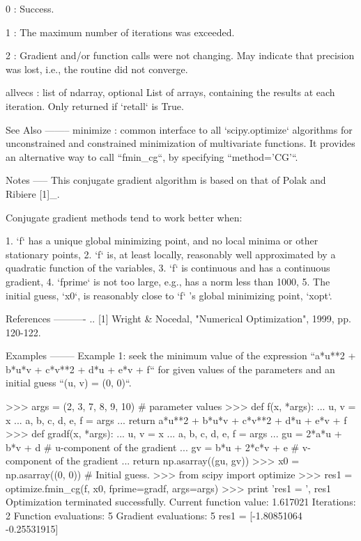 \begin{DoxyVerb}
    0 : Success.

    1 : The maximum number of iterations was exceeded.

    2 : Gradient and/or function calls were not changing.  May indicate
        that precision was lost, i.e., the routine did not converge.

allvecs : list of ndarray, optional
    List of arrays, containing the results at each iteration.
    Only returned if `retall` is True.

See Also
--------
minimize : common interface to all `scipy.optimize` algorithms for
           unconstrained and constrained minimization of multivariate
           functions.  It provides an alternative way to call
           ``fmin_cg``, by specifying ``method='CG'``.

Notes
-----
This conjugate gradient algorithm is based on that of Polak and Ribiere
[1]_.

Conjugate gradient methods tend to work better when:

1. `f` has a unique global minimizing point, and no local minima or
   other stationary points,
2. `f` is, at least locally, reasonably well approximated by a
   quadratic function of the variables,
3. `f` is continuous and has a continuous gradient,
4. `fprime` is not too large, e.g., has a norm less than 1000,
5. The initial guess, `x0`, is reasonably close to `f` 's global
   minimizing point, `xopt`.

References
----------
.. [1] Wright & Nocedal, "Numerical Optimization", 1999, pp. 120-122.

Examples
--------
Example 1: seek the minimum value of the expression
``a*u**2 + b*u*v + c*v**2 + d*u + e*v + f`` for given values
of the parameters and an initial guess ``(u, v) = (0, 0)``.

>>> args = (2, 3, 7, 8, 9, 10)  # parameter values
>>> def f(x, *args):
...     u, v = x
...     a, b, c, d, e, f = args
...     return a*u**2 + b*u*v + c*v**2 + d*u + e*v + f
>>> def gradf(x, *args):
...     u, v = x
...     a, b, c, d, e, f = args
...     gu = 2*a*u + b*v + d     # u-component of the gradient
...     gv = b*u + 2*c*v + e     # v-component of the gradient
...     return np.asarray((gu, gv))
>>> x0 = np.asarray((0, 0))  # Initial guess.
>>> from scipy import optimize
>>> res1 = optimize.fmin_cg(f, x0, fprime=gradf, args=args)
>>> print 'res1 = ', res1
Optimization terminated successfully.
         Current function value: 1.617021
         Iterations: 2
         Function evaluations: 5
         Gradient evaluations: 5
res1 =  [-1.80851064 -0.25531915]


\end{DoxyVerb}
